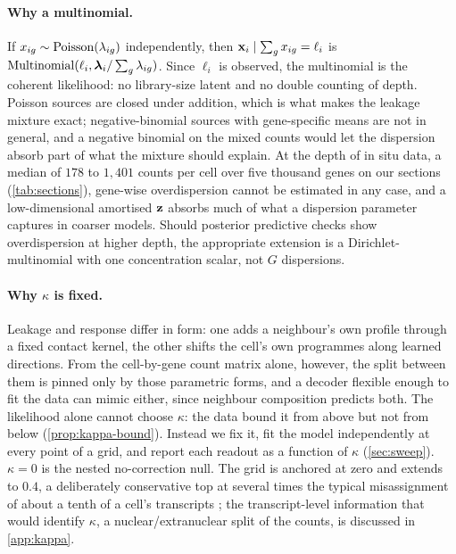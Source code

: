 \paragraph{Why a multinomial.}
 If $x_{ig} \sim \operatorname{Poisson}(\lambda_{ig})$ independently, then $\mathbf{x}_i \mid \sum_g x_{ig} = \ell_i$ is $\operatorname{Multinomial}(\ell_i, \boldsymbol{\lambda}_i / \sum_g \lambda_{ig})$. Since $\ell_i$ is observed, the multinomial is the coherent likelihood: no library-size latent and no double counting of depth. Poisson sources are closed under addition, which is what makes the leakage mixture exact; negative-binomial sources with gene-specific means are not in general, and a negative binomial on the mixed counts would let the dispersion absorb part of what the mixture should explain. At the depth of in situ data, a median of $178$ to $1{,}401$ counts per cell over five thousand genes on our sections (\cref{tab:sections}), gene-wise overdispersion cannot be estimated in any case, and a low-dimensional amortised $\mathbf{z}$ absorbs much of what a dispersion parameter captures in coarser models. Should posterior predictive checks show overdispersion at higher depth, the appropriate extension is a Dirichlet-multinomial with one concentration scalar, not $G$ dispersions.

\paragraph{Why $\kappa$ is fixed.}
 Leakage and response differ in form: one adds a neighbour's own profile through a fixed contact kernel, the other shifts the cell's own programmes along learned directions. From the cell-by-gene count matrix alone, however, the split between them is pinned only by those parametric forms, and a decoder flexible enough to fit the data can mimic either, since neighbour composition predicts both. The likelihood alone cannot choose $\kappa$: the data bound it from above but not from below (\cref{prop:kappa-bound}). Instead we fix it, fit the model independently at every point of a grid, and report each readout as a function of $\kappa$ (\cref{sec:sweep}). $\kappa = 0$ is the nested no-correction null. The grid is anchored at zero and extends to $0.4$, a deliberately conservative top at several times the typical misassignment of about a tenth of a cell's transcripts \citep{yang2025mistic}; the transcript-level information that would identify $\kappa$, a nuclear/extranuclear split of the counts, is discussed in \cref{app:kappa}.

